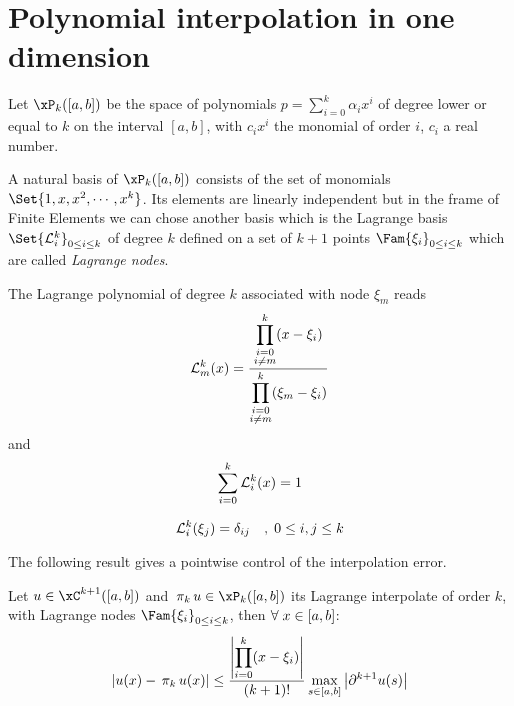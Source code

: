 \section{Polynomial interpolation in one dimension}

Let $\xP_k([a,b])$ be the space of polynomials $p = \sum_{i=0}^k \alpha_i x^i$ of degree lower or equal to $k$ on the interval $[a,b]$, with $c_i x^i$ the monomial of order $i$, $c_i$ a real number.

\medskip
A natural basis of $\xP_k([a,b])$ consists of the set of monomials $\Set{1,x,x^2,\cdots,x^k}$.
Its elements are linearly independent but in the frame of Finite Elements we can chose another basis which is the Lagrange basis $\Set{\Lgr{k}{i}}_{0 \leq i \leq k}$ of degree $k$ defined on a set of $k+1$ points $\Fam{\xi_i}_{0 \leq i \leq k}$ which are called \textit{Lagrange nodes}.

\begin{dfntn}
\label{def:lagrange_poly}
The Lagrange polynomial of degree $k$ associated with node $\xi_m$ reads
\begin{equation*}
\mathcal L^{k}_{m}(x) = \frac{\displaystyle\prod_{\substack{i=0\\i\not=m}}^k (x - \xi_i)}{\displaystyle\prod_{\substack{i=0\\i\not=m}}^k (\xi_m - \xi_i)}
\end{equation*}
and
\begin{equation*}
\sum_{i=0}^{k}\mathcal L^{k}_{i}(x) = 1
\end{equation*}
\end{dfntn}

\begin{prpstn}
\begin{equation*}
\mathcal L^{k}_{i}(\xi_j) = \delta_{ij}\quad,\;0 \leq i,j \leq k
\end{equation*}
\end{prpstn}


\bigskip
The following result gives a pointwise control of the interpolation error.
\begin{thrm}
\label{th:polyinterpol}
Let $u\in\xC^{k+1}([a,b])$ and $\Projh{k} u \in \xP_k([a,b])$ its Lagrange interpolate of order $k$, with Lagrange nodes $\Fam{\xi_i}_{0\leq i \leq k}$, then ${\forall\;} x \in [a,b]$:
\begin{equation*}
\left\lvert u(x) - \,\mathrm{\pi}_{k}\, u(x) \right\rvert \leq \frac{\left\lvert \displaystyle\prod_{i=0}^k (x - \xi_i) \right\rvert}{(k+1)!}\max_{s\in[a,b]}\left\lvert \partial^{k+1} u(s) \right\rvert
\end{equation*}
\end{thrm}

